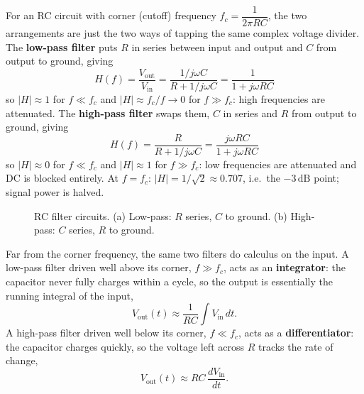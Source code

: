 \begin{fact}
For an RC circuit with corner (cutoff) frequency $f_c = \dfrac{1}{2\pi RC}$, the two arrangements are just the two ways of tapping the same complex voltage divider. The \textbf{low-pass filter} puts $R$ in series between input and output and $C$ from output to ground, giving
\[
  H(f) = \frac{V_\text{out}}{V_\text{in}} = \frac{1/j\omega C}{R + 1/j\omega C} = \frac{1}{1 + j\omega RC}
\]
so $|H| \approx 1$ for $f \ll f_c$ and $|H| \approx f_c/f \to 0$ for $f \gg f_c$: high frequencies are attenuated. The \textbf{high-pass filter} swaps them, $C$ in series and $R$ from output to ground, giving
\[
  H(f) = \frac{R}{R + 1/j\omega C} = \frac{j\omega RC}{1 + j\omega RC}
\]
so $|H| \approx 0$ for $f \ll f_c$ and $|H| \approx 1$ for $f \gg f_c$: low frequencies are attenuated and DC is blocked entirely. At $f = f_c$: $|H| = 1/\sqrt{2} \approx 0.707$, i.e.\ the $-3\,\text{dB}$ point; signal power is halved.
\end{fact}

\begin{figure}[H]
\begin{center}
\end{center}
\caption{RC filter circuits. (a) Low-pass: $R$ series, $C$ to ground. (b) High-pass: $C$ series, $R$ to ground.}
\end{figure}

\begin{fact}
Far from the corner frequency, the same two filters do calculus on the input. A low-pass filter driven well above its corner, $f \gg f_c$, acts as an \textbf{integrator}: the capacitor never fully charges within a cycle, so the output is essentially the running integral of the input,
\[
  V_\text{out}(t) \approx \frac{1}{RC}\int V_\text{in}\,dt.
\]
A high-pass filter driven well below its corner, $f \ll f_c$, acts as a \textbf{differentiator}: the capacitor charges quickly, so the voltage left across $R$ tracks the rate of change,
\[
  V_\text{out}(t) \approx RC\,\frac{dV_\text{in}}{dt}.
\]
\end{fact}

